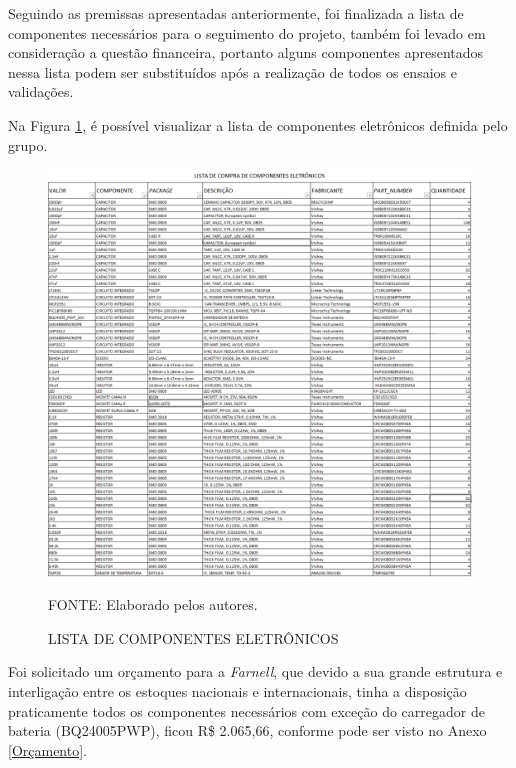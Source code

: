 \documentclass[
	12pt,				%
	openright,			%
	oneside,			%
	a4paper,			%
	english,			%
	french,				%
	spanish,			%
	brazil,				%
	oldfontcommands
	]{abntex2}
\begin{document}
	Seguindo as premissas apresentadas anteriormente, foi finalizada a lista de componentes necessários para o seguimento do projeto, também foi levado em consideração a questão financeira, portanto alguns componentes apresentados nessa lista podem ser substituídos após a realização de todos os ensaios e validações.
	
	Na Figura \ref{Fig_Lista}, é possível visualizar a lista de componentes eletrônicos definida pelo grupo.
	
	\begin{figure}[th]
		\caption{LISTA DE COMPONENTES ELETRÔNICOS}
		\label{Fig_Lista}
		\centering
		\includegraphics[width=1.0\linewidth]{./figs/comp}
			
		\begin{small}
			FONTE: Elaborado pelos autores.
		\end{small}		
	\end{figure}
	\pagebreak
	
	Foi solicitado um orçamento para a \textit{Farnell}, que devido a sua grande estrutura e interligação entre os estoques nacionais e internacionais, tinha a disposição praticamente todos os componentes necessários com exceção do carregador de bateria (BQ24005PWP), ficou R\$ 2.065,66, conforme pode ser visto no Anexo \ref{Orçamento}.
	


	
	
\end{document}
